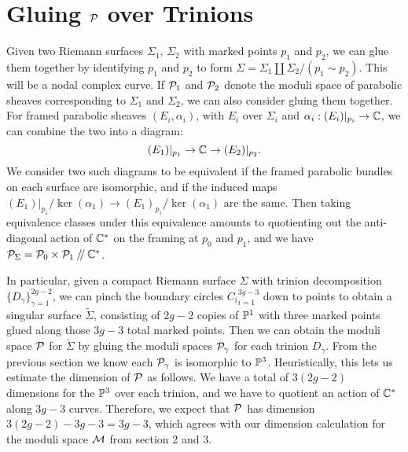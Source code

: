 	\section{Gluing $\mathcal{P}$ over Trinions }
	Given two Riemann surfaces $\Sigma_1$, $\Sigma_2$ with marked points $p_1$ and $p_2$, we can glue them together by identifying $p_1$ and $p_2$ to form $\Sigma = \Sigma_1 \coprod \Sigma_2 / (p_1 \sim p_2)$. This will be a nodal complex curve. If $\mathcal{P}_1$ and $\mathcal{P}_2$ denote the moduli space of parabolic sheaves corresponding to $\Sigma_1$ and $\Sigma_2$, we can also consider gluing them together. For framed parabolic sheaves $(E_i,\alpha_i)$, with $E_i$ over $\Sigma_i$ and $\alpha_i:(E_i)|_{p_i}\to \mathbb{C}$, we can combine the two into a diagram:
	\begin{equation}
		(E_1)|_{p_1} \to \mathbb{C} \rightarrow (E_2)|_{p_2}.
	\end{equation}
	We consider two such diagrams to be equivalent if the framed parabolic bundles on each surface are isomorphic, and if the induced maps $(E_1)|_{p_1}/\ker(\alpha_1) \to (E_1)_{p_1}/\ker(\alpha_1)$ are the same. Then taking equivalence classes under this equivalence amounts to quotienting out the anti-diagonal action of $\mathbb{C}^\ast$ on the framing at $p_0$ and $p_1$, and we have $\mathcal{P}_{\Sigma} = \mathcal{P}_0 \times \mathcal{P}_1 \mathbin{/\mkern-4mu/} \mathbb{C}^\ast$. 
	
	In particular, given a compact Riemann surface $\Sigma$ with trinion decomposition $\{D_\gamma\}_{\gamma=1}^{2g-2}$, we can pinch the boundary circles ${C_i}_{i=1}^{3g-3}$ down to points to obtain a singular surface $\tilde{\Sigma}$, consisting of $2g-2$ copies of $\mathbb{P}^1$ with three marked points glued along those $3g-3$ total marked points. Then we can obtain the moduli space $\mathcal{P}$ for $\tilde{\Sigma}$ by gluing the moduli spaces $\mathcal{P}_\gamma$ for each trinion $D_\gamma$. From the previous section we know each $\mathcal{P}_\gamma$ is isomorphic to $\mathbb{P}^3$. Heuristically, this lets us estimate the dimension of $\mathcal{P}$ as follows. We have a total of $3(2g-2)$ dimensions for the $\mathbb{P}^3$ over each trinion, and we have to quotient an action of $\mathbb{C}^\ast$ along $3g-3$ curves. Therefore, we expect that $\mathcal{P}$ has dimension $3(2g-2)-3g-3 = 3g-3$, which agrees with our dimension calculation for the moduli space $\mathcal{M}$ from section 2 and 3. \vspace{1em}
	
